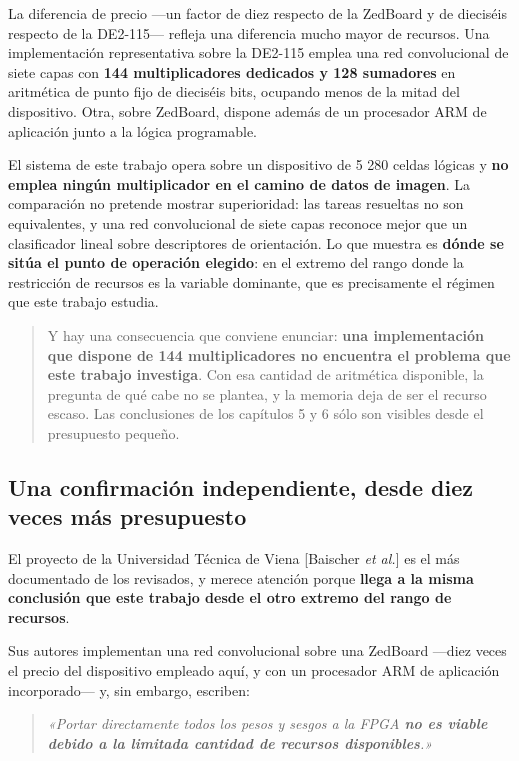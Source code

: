 La diferencia de precio ---un factor de diez respecto de la ZedBoard y
de dieciséis respecto de la DE2-115--- refleja una diferencia mucho
mayor de recursos. Una implementación representativa sobre la DE2-115
emplea una red convolucional de siete capas con \textbf{144
multiplicadores dedicados y 128 sumadores} en aritmética de punto fijo
de dieciséis bits, ocupando menos de la mitad del dispositivo. Otra,
sobre ZedBoard, dispone además de un procesador ARM de aplicación junto
a la lógica programable.

El sistema de este trabajo opera sobre un dispositivo de 5 280 celdas
lógicas y \textbf{no emplea ningún multiplicador en el camino de datos
de imagen}. La comparación no pretende mostrar superioridad: las tareas
resueltas no son equivalentes, y una red convolucional de siete capas
reconoce mejor que un clasificador lineal sobre descriptores de
orientación. Lo que muestra es \textbf{dónde se sitúa el punto de
operación elegido}: en el extremo del rango donde la restricción de
recursos es la variable dominante, que es precisamente el régimen que
este trabajo estudia.

\begin{quote}
Y hay una consecuencia que conviene enunciar: \textbf{una implementación
que dispone de 144 multiplicadores no encuentra el problema que este
trabajo investiga}. Con esa cantidad de aritmética disponible, la
pregunta de qué cabe no se plantea, y la memoria deja de ser el recurso
escaso. Las conclusiones de los capítulos 5 y 6 sólo son visibles desde
el presupuesto pequeño.
\end{quote}

\subsection{Una confirmación independiente, desde diez veces más
presupuesto}\label{una-confirmaciuxf3n-independiente-desde-diez-veces-muxe1s-presupuesto}

El proyecto de la Universidad Técnica de Viena {[}Baischer \emph{et
al.}{]} es el más documentado de los revisados, y merece atención porque
\textbf{llega a la misma conclusión que este trabajo desde el otro
extremo del rango de recursos}.

Sus autores implementan una red convolucional sobre una ZedBoard ---diez
veces el precio del dispositivo empleado aquí, y con un procesador ARM
de aplicación incorporado--- y, sin embargo, escriben:

\begin{quote}
\emph{«Portar directamente todos los pesos y sesgos a la FPGA \textbf{no
es viable debido a la limitada cantidad de recursos disponibles}.»}
\end{quote}

